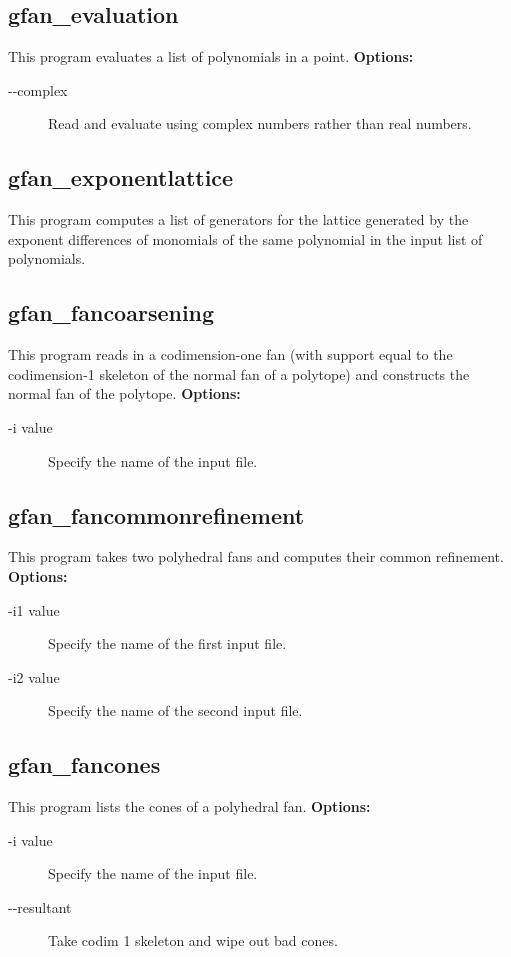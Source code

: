 {{{{\subsection{gfan\_evaluation}\label{applist:_evaluation}
This program evaluates a list of polynomials in a point.
\newline
{\bf Options:}
\begin{description}
\item[-\hspace{0.013cm}-complex]Read and evaluate using complex numbers rather than real numbers.\end{description}


{\subsection{gfan\_exponentlattice}\label{applist:_exponentlattice}
This program computes a list of generators for the lattice generated by the exponent differences of monomials of the same polynomial in the input list of polynomials.


{\subsection{gfan\_fancoarsening}\label{applist:_fancoarsening}
This program reads in a codimension-one fan (with support equal to the codimension-1 skeleton of the normal fan of a polytope) and constructs the normal fan of the polytope.
\newline
{\bf Options:}
\begin{description}
\item[-i value]Specify the name of the input file.\end{description}


{\subsection{gfan\_fancommonrefinement}\label{applist:_fancommonrefinement}
This program takes two polyhedral fans and computes their common refinement.
\newline
{\bf Options:}
\begin{description}
\item[-i1 value]Specify the name of the first input file.\item[-i2 value]Specify the name of the second input file.\end{description}


{\subsection{gfan\_fancones}\label{applist:_fancones}
This program lists the cones of a polyhedral fan.
\newline
{\bf Options:}
\begin{description}
\item[-i value]Specify the name of the input file.\item[-\hspace{0.013cm}-resultant]Take codim 1 skeleton and wipe out bad cones.\end{description}


}}}}}}}}
